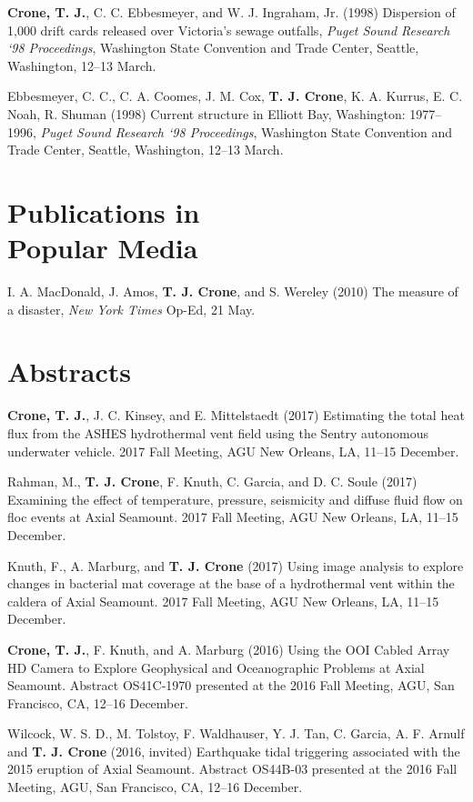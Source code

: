 \documentclass[11pt]{res}
\begin{document}
\begin{resume}
{\bf Crone, T. J.}, C. C. Ebbesmeyer,
and W. J. Ingraham, Jr. (1998) Dispersion of 1,000 drift cards released over Victoria's sewage outfalls, {\em Puget Sound Research `98 Proceedings}, Washington State Convention and Trade Center, Seattle, Washington, 12--13 March.

Ebbesmeyer, C. C., C. A. Coomes, J. M. Cox, {\bf T. J. Crone}, K. A. Kurrus, E. C. Noah, R. Shuman (1998) Current structure in Elliott Bay, Washington: 1977--1996, {\em Puget Sound Research `98 Proceedings}, Washington State Convention and Trade Center, Seattle, Washington, 12--13 March.

\section{\sc Publications in\\Popular Media} I. A. MacDonald, J. Amos, {\bf T.
J. Crone}, and S. Wereley (2010) The measure of a disaster, {\em New York Times} Op-Ed, 21 May.

\section{\sc Abstracts}

{\bf Crone, T. J.}, J. C. Kinsey, and E. Mittelstaedt (2017) Estimating the total heat flux from the ASHES hydrothermal vent field using the Sentry autonomous underwater vehicle. 2017 Fall Meeting, AGU New Orleans, LA, 11--15 December.

Rahman, M., {\bf T. J. Crone}, F. Knuth, C. Garcia, and D. C. Soule (2017) Examining the effect of temperature, pressure, seismicity and diffuse fluid flow on floc events at Axial Seamount. 2017 Fall Meeting, AGU New Orleans, LA, 11--15 December.

Knuth, F., A. Marburg, and {\bf T. J. Crone} (2017) Using image analysis to explore changes in bacterial mat coverage at the base of a hydrothermal vent within the caldera of Axial Seamount. 2017 Fall Meeting, AGU New Orleans, LA, 11--15 December.

{\bf Crone, T. J.}, F. Knuth, and A. Marburg (2016) Using the OOI Cabled Array HD Camera to Explore Geophysical and Oceanographic Problems at Axial Seamount. Abstract OS41C-1970 presented at the 2016 Fall Meeting, AGU, San Francisco, CA, 12--16 December.

Wilcock, W. S. D., M. Tolstoy, F. Waldhauser, Y. J. Tan, C. Garcia, A. F. Arnulf and {\bf T. J. Crone} (2016, invited) Earthquake tidal triggering associated with the 2015 eruption of Axial Seamount. Abstract OS44B-03 presented at the 2016 Fall Meeting, AGU, San Francisco, CA, 12--16 December.


\end{resume}
\end{document}
